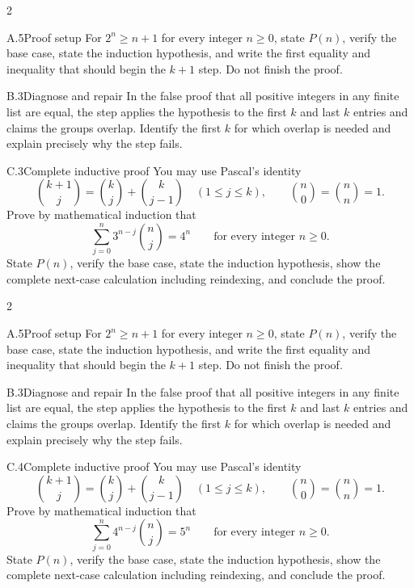 \documentclass[9pt]{extarticle}
\begin{document}
\CoreWorkArea
\FormBreak
{}
\begin{multicols}{2}
\begin{CompactCoreProblem}{A.5}{Proof setup}
For $2^n\ge n+1$ for every integer $n\ge0$, state $P(n)$, verify the base case, state the induction hypothesis, and write the first equality and inequality that should begin the $k+1$ step. Do not finish the proof.
\end{CompactCoreProblem}
\begin{CompactCoreProblem}{B.3}{Diagnose and repair}
In the false proof that all positive integers in any finite list are equal, the step applies the hypothesis to the first $k$ and last $k$ entries and claims the groups overlap. Identify the first $k$ for which overlap is needed and explain precisely why the step fails.
\end{CompactCoreProblem}
\end{multicols}
\begin{CompactCoreProblem}{C.3}{Complete inductive proof}
You may use Pascal's identity
\[
\binom{k+1}{j}=\binom{k}{j}+\binom{k}{j-1}
\quad(1\le j\le k),\qquad
\binom{n}{0}=\binom{n}{n}=1.
\]
Prove by mathematical induction that
\[
\sum_{j=0}^{n} 3^{n-j}\binom{n}{j}=4^n\qquad\text{for every integer }n\ge0.
\]
State $P(n)$, verify the base case, state the induction hypothesis, show the complete next-case calculation including reindexing, and conclude the proof.
\end{CompactCoreProblem}
\CoreWorkArea
\FormBreak
{}
\begin{multicols}{2}
\begin{CompactCoreProblem}{A.5}{Proof setup}
For $2^n\ge n+1$ for every integer $n\ge0$, state $P(n)$, verify the base case, state the induction hypothesis, and write the first equality and inequality that should begin the $k+1$ step. Do not finish the proof.
\end{CompactCoreProblem}
\begin{CompactCoreProblem}{B.3}{Diagnose and repair}
In the false proof that all positive integers in any finite list are equal, the step applies the hypothesis to the first $k$ and last $k$ entries and claims the groups overlap. Identify the first $k$ for which overlap is needed and explain precisely why the step fails.
\end{CompactCoreProblem}
\end{multicols}
\begin{CompactCoreProblem}{C.4}{Complete inductive proof}
You may use Pascal's identity
\[
\binom{k+1}{j}=\binom{k}{j}+\binom{k}{j-1}
\quad(1\le j\le k),\qquad
\binom{n}{0}=\binom{n}{n}=1.
\]
Prove by mathematical induction that
\[
\sum_{j=0}^{n} 4^{n-j}\binom{n}{j}=5^n\qquad\text{for every integer }n\ge0.
\]
State $P(n)$, verify the base case, state the induction hypothesis, show the complete next-case calculation including reindexing, and conclude the proof.
\end{CompactCoreProblem}
\end{document}
